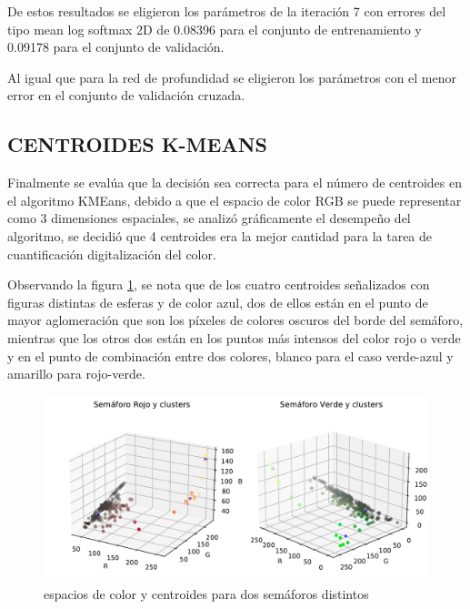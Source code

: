 De estos resultados se eligieron los parámetros de la iteración 7 con errores del tipo mean log softmax 2D de 0.08396 para el conjunto de entrenamiento y 0.09178 para el conjunto de validación.

Al igual que para la red de profundidad se eligieron los parámetros con el menor error en el conjunto de validación cruzada.

\subsection{CENTROIDES K-MEANS}
Finalmente se evalúa que la decisión sea correcta para el número de centroides en el algoritmo KMEans, debido a que el espacio de color RGB se puede representar como 3 dimensiones espaciales, se analizó gráficamente el desempeño del algoritmo, se decidió que 4 centroides era la mejor cantidad para la tarea de cuantificación digitalización del color.

Observando la figura \ref{colorspace}, se nota que de los cuatro centroides señalizados con figuras distintas de esferas y de color azul, dos de ellos están en el punto de mayor aglomeración que son los píxeles de colores oscuros del borde del semáforo, mientras que los otros dos están en los puntos más intensos del color rojo o verde y en el punto de combinación entre dos colores, blanco para el caso verde-azul y amarillo para rojo-verde.

\begin{figure}[H]
	\centering
	\includegraphics[scale=0.65]{imagenes/sign_3d}
	\caption[Espacios de color y centroides para dos semáforos distintos]{espacios de color y centroides para dos semáforos distintos}
	\label{colorspace}
\end{figure}